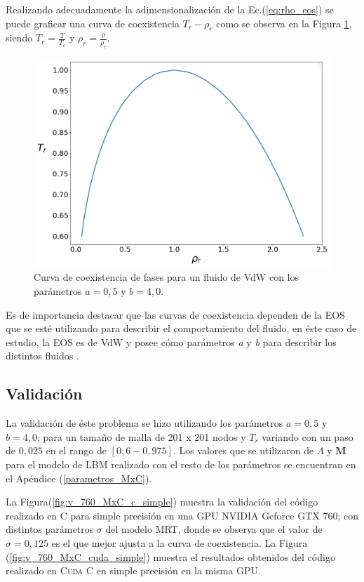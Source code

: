 Realizando adecuadamente la adimensionalización  de la Ec.(\ref{eq:rho_eos}) se puede graficar una curva de coexistencia $T_r - \rho_r$  como se observa en la Figura \ref{fig:T_r_rho_r_analitico}, siendo $T_r = \frac{T}{T_c}$ y $\rho_r = \frac{\rho}{\rho_c}$.

\begin{figure}[htbp]
	\centering
	\includegraphics[width=.8\textwidth]{figs/cap4/Diagrama_T_r_vs_rho_r_analitico}
	\caption{Curva de coexistencia de fases para un fluido de VdW con los parámetros $a = 0,5 $ y $b = 4,0 $.}
	\label{fig:T_r_rho_r_analitico}	
\end{figure}

\newpage
Es de importancia destacar que las curvas de coexistencia dependen de la EOS que se esté utilizando para describir el comportamiento del fluido, en éste caso de estudio, la EOS es de VdW y posee  cómo parámetros \textit{a} y \textit{b} para describir los distintos fluidos .

\subsection{Validación}

La validación de éste problema se hizo utilizando los parámetros $a =0,5$ y $b = 4,0$; para un tamaño de malla de 201 x 201 nodos y $T_r$ variando con un paso de $0,025$ en el rango de $[0,6 - 0,975]$.  Los valores que se utilizaron de $\Lambda$ y $\mathbf{M}$ para el modelo de LBM realizado  con el resto de los parámetros se encuentran en el Apéndice (\ref{parametros_MxC}).

La Figura(\ref{fig:v_760_MxC_c_simple}) muestra la validación del código realizado en \textsc{C} para simple precisión en una GPU NVIDIA Geforce GTX 760; con distintos parámetros $\sigma$ del modelo MRT, donde se observa que el valor de $\sigma = 0,125$ es el que mejor ajusta a la curva de coexistencia. La Figura (\ref{fig:v_760_MxC_cuda_simple}) muestra el resultados obtenidos del código realizado en \textsc{Cuda C} en simple precisión en la misma GPU.

